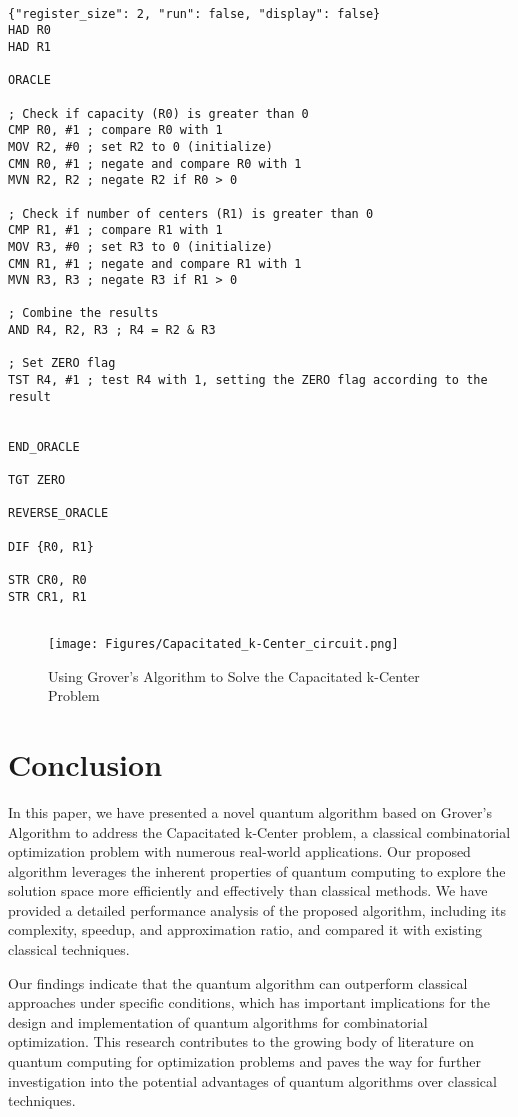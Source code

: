\begin{lstlisting}

{"register_size": 2, "run": false, "display": false}
HAD R0
HAD R1

ORACLE

; Check if capacity (R0) is greater than 0
CMP R0, #1 ; compare R0 with 1
MOV R2, #0 ; set R2 to 0 (initialize)
CMN R0, #1 ; negate and compare R0 with 1
MVN R2, R2 ; negate R2 if R0 > 0

; Check if number of centers (R1) is greater than 0
CMP R1, #1 ; compare R1 with 1
MOV R3, #0 ; set R3 to 0 (initialize)
CMN R1, #1 ; negate and compare R1 with 1
MVN R3, R3 ; negate R3 if R1 > 0

; Combine the results
AND R4, R2, R3 ; R4 = R2 & R3

; Set ZERO flag
TST R4, #1 ; test R4 with 1, setting the ZERO flag according to the result


END_ORACLE

TGT ZERO

REVERSE_ORACLE

DIF {R0, R1}

STR CR0, R0
STR CR1, R1


\end{lstlisting}

\begin{figure}[htp]
    \centering
    \texttt{[image: Figures/Capacitated\_k-Center\_circuit.png]}
    \caption{Using Grover's Algorithm to Solve the Capacitated k-Center Problem}
    \label{fig:Capacitated_k-Center}
\end{figure}

\section{Conclusion}

In this paper, we have presented a novel quantum algorithm based on Grover's Algorithm to address the Capacitated k-Center problem, a classical combinatorial optimization problem with numerous real-world applications. Our proposed algorithm leverages the inherent properties of quantum computing to explore the solution space more efficiently and effectively than classical methods. We have provided a detailed performance analysis of the proposed algorithm, including its complexity, speedup, and approximation ratio, and compared it with existing classical techniques.

Our findings indicate that the quantum algorithm can outperform classical approaches under specific conditions, which has important implications for the design and implementation of quantum algorithms for combinatorial optimization. This research contributes to the growing body of literature on quantum computing for optimization problems and paves the way for further investigation into the potential advantages of quantum algorithms over classical techniques.

